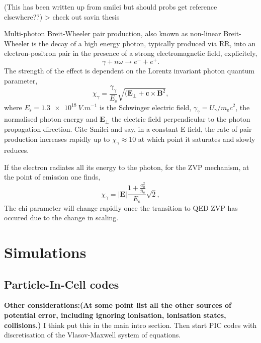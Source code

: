 (This has been written up from smilei but should probs get reference elsewhere??) > check out savin thesis

Multi-photon Breit-Wheeler pair production, also known as non-linear Breit-Wheeler is the decay of a high energy photon, typically produced via \ac{RR}, into an electron-positron pair in the presence of a strong electromagnetic field, explicitely,
\begin{equation}
	\gamma + n\omega \to e^- + e^+.
\end{equation}
The strength of the effect is dependent on the Lorentz invariant photon quantum parameter,
\begin{equation}
	\chi_\gamma = \frac{\gamma_\gamma}{E_\mathrm{s}} \sqrt{(\mathbf{E}_\perp + \mathbf{c}\times \mathbf{B}^2},
\end{equation}
where $E_\mathrm{s} = \qty{1.3e18}{V.m^{-1}}$ is the Schwinger electric field, $\gamma_\gamma = U_\gamma /m_\mathrm{e}c^2$, the normalised photon energy and $\mathbf{E}_\perp$ the electric field perpendicular to the photon propagation direction. Cite Smilei and say, in a constant E-field, the rate of pair production increases rapidly up to $\chi_\gamma \approx 10$ at which point it saturates and slowly reduces.


If the electron radiates all its energy to the photon, for the ZVP mechanism, at the point of emission one finds,
\begin{equation}
	\chi_\gamma = |\mathbf{E}|\frac{1 + \frac{a^2_0}{\bar{n}_\mathrm{e}}}{E_\mathrm{s}} \sqrt{2},
\end{equation}
The chi parameter will change rapidly once the transition to QED ZVP has occured due to the change in scaling.


\section{Simulations}
\subsection{Particle-In-Cell codes}

\textbf{Other considerations:(At some point list all the other sources of potential error, including ignoring ionisation, ionisation states, collisions.)}
I think put this in the main intro section. Then start PIC codes with discretisation of the Vlasov-Maxwell system of equations.

